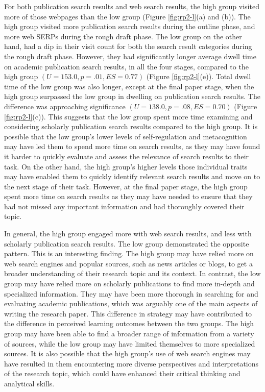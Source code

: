 \documentclass[letterpaper, nobind]{templates/ociamthesis}
\begin{document}
For both publication search results and web search results, the high group visited more of those webpages than the low group (Figure \ref{fig:rp2-l}(a) and (b)).
The high group visited more publication search results during the outline phase, and more web SERPs during the rough draft phase.
The low group on the other hand, had a dip in their visit count for both the search result categories during the rough draft phase.
However, they had significantly longer average dwell time on academic publication search results, in all the four stages, compared to the high group \((U = 153.0, p = .01, ES = 0.77)\) (Figure \ref{fig:rp2-l}(e)).
Total dwell time of the low group was also longer, except at the final paper stage, when the high group surpassed the low group in dwelling on publication search results.
The difference was approaching significance \((U = 138.0, p = .08, ES = 0.70)\) (Figure \ref{fig:rp2-l}(c)).
This suggests that the low group spent more time examining and considering scholarly publication search results compared to the high group.
It is possible that the low group's lower levels of self-regulation and metacognition may have led them to spend more time on search results, as they may have found it harder to quickly evaluate and assess the relevance of search results to their task.
On the other hand, the high group's higher levels those individual traits may have enabled them to quickly identify relevant search results and move on to the next stage of their task.
However, at the final paper stage, the high group spent more time on search results as they may have needed to ensure that they had not missed any important information and had thoroughly covered their topic.

In general, the high group engaged more with web search results, and less with scholarly publication search results.
The low group demonstrated the opposite pattern.
This is an interesting finding.
The high group may have relied more on web search engines and popular sources, such as news articles or blogs, to get a broader understanding of their research topic and its context.
In contrast, the low group may have relied more on scholarly publications to find more in-depth and specialized information.
They may have been more thorough in searching for and evaluating academic publications, which was arguably one of the main aspects of writing the research paper.
This difference in strategy may have contributed to the difference in perceived learning outcomes between the two groups.
The high group may have been able to find a broader range of information from a variety of sources, while the low group may have limited themselves to more specialized sources.
It is also possible that the high group's use of web search engines may have resulted in them encountering more diverse perspectives and interpretations of the research topic, which could have enhanced their critical thinking and analytical skills.
\end{document}
